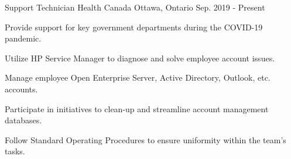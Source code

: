 

\begin{cventries}

  \cventry
    {Support Technician} %
    {Health Canada} %
    {Ottawa, Ontario} %
    {Sep. 2019 - Present} %
    {
      \begin{cvitems} %
        \item {Provide support for key government departments during the COVID-19 pandemic.}
        \item {Utilize HP Service Manager to diagnose and solve employee account issues.}
        \item {Manage employee Open Enterprise Server, Active Directory, Outlook, etc. accounts.}
	    \item {Participate in initiatives to clean-up and streamline account management databases.}
	    \item {Follow Standard Operating Procedures to ensure uniformity within the team's tasks.}
      \end{cvitems}
    }



\end{cventries}
